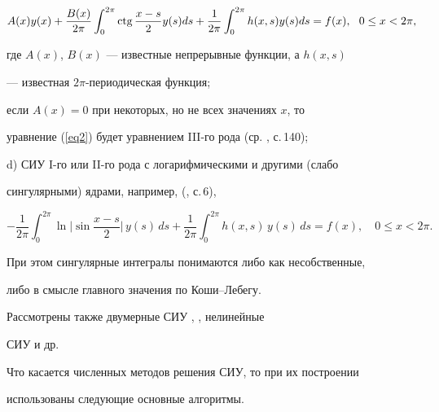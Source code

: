 \begin{equation}


\label{eq2}


A(x)y(x)+\frac{B(x)}{2\pi}\int_0^{2\pi}\ctg\frac{x-s}2y(s)ds+


\frac1{2\pi}\int_0^{2\pi}h(x,s)y(s)ds=f(x),\ \ 0\le x<2\pi,


\end{equation}


где $A(x)$, $B(x)$ --- известные непрерывные функции, а $h(x,s)$


--- известная $2\pi$-периодическая функция;


если $A(x)=0$ при некоторых, но не всех значениях $x$, то


уравнение (\ref{eq2}) будет уравнением III-го рода (ср. \cite{vs}, с.\,140);





\noindent{}d) СИУ I-го или II-го рода с логарифмическими и другими (слабо


сингулярными) ядрами, например, (\cite{gab}, с.\,6),


\begin{equation}


\label{eq3}


-\frac1{2\pi}\int_0^{2\pi}\ln\Big|\sin\frac{x-s}2\Big|\,y(s)\,ds+


\frac1{2\pi}\int_0^{2\pi}h(x,s)\,y(s)\,ds=f(x), \quad 0\le x<2\pi.


\end{equation}





При этом сингулярные интегралы понимаются либо как несобственные,


либо в смысле главного значения по Коши--Лебегу.





Рассмотрены также двумерные СИУ \cite{iv1}, \cite{bk}, нелинейные


СИУ \cite{ra} и др.





Что касается численных методов решения СИУ, то при их построении


использованы следующие основные алгоритмы. 





